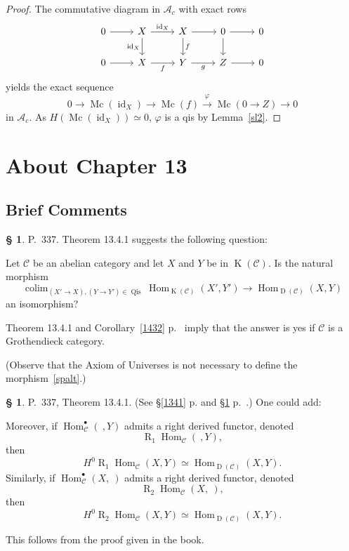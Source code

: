 \documentclass[12pt]{article}
\theoremstyle{remark}
\theoremstyle{definition}
\newtheorem{s}[thm]{\S}
\newcommand{\bu}{\bullet}
\newcommand{\oo}{\operatorname}
\newcommand{\A}{\mathcal A}
\newcommand{\C}{\mathcal C}
\newcommand{\pp}{\varphi}
\newcommand{\xr}{\xrightarrow}
\DeclareMathOperator*{\colim}{colim}
\DeclareMathOperator{\id}{id}
\DeclareMathOperator{\Hom}{Hom}
\DeclareMathOperator{\Mc}{Mc}
\begin{document}
\begin{proof}
The commutative diagram in $\A_c$ with exact rows 
$$
\begin{tikzcd}
0\ar{r}&X\ar{d}[swap]{\id_X}\ar{r}{\id_X}&X\ar{d}{f}\ar{r}&0\ar{d}\ar{r}&0\\ 
0\ar{r}&X\ar{r}[swap]{f}&Y\ar{r}[swap]{g}&Z\ar{r}&0
\end{tikzcd}
$$ 
yields the exact sequence 
$$
0\to\Mc(\id_X)\to\Mc(f)\xr\pp\Mc(0\to Z)\to0
$$
in $\A_c$. As $H(\Mc(\id_X))\simeq0$, $\pp$ is a qis by Lemma~\ref{sl2}.
\end{proof}


\section{About Chapter 13}

\subsection{Brief Comments}

\begin{s}\label{q337}
P.~337. Theorem 13.4.1 suggests the following question: 

Let $\C$ be an abelian category and let $X$ and $Y$ be in $\oo K(\C)$. Is the natural morphism 
%
\begin{equation}\label{spalt}
\colim_{(X'\to X),(Y\to Y')\in\oo{Qis}}\Hom_{\oo K(\C)}(X',Y')\to\Hom_{\oo D(\C)}(X,Y)
\end{equation}
%
an isomorphism?

Theorem 13.4.1 and Corollary~\ref{1432} p.~\pageref{1432} imply that the answer is yes if $\C$ is a Grothendieck category. 

(Observe that the Axiom of Universes is not necessary to define the morphism~\eqref{spalt}.)
\end{s}

%

\begin{s}
P.~337, Theorem 13.4.1. (See \S\ref{1341} p. \pageref{1341} and \S\ref{q337} p.~\pageref{q337}.) One could add:

Moreover, if $\Hom_\C^\bu(\ ,Y)$ admits a right derived functor, denoted 
$$
\oo R_1\!\Hom_\C(\ ,Y),
$$ 
then 
$$
H^0\oo R_1\!\Hom_\C(X,Y)\simeq\Hom_{\oo D(\C)}(X,Y).
$$ 
Similarly, if $\Hom_\C^\bu(X,\ )$ admits a right derived functor, denoted 
$$
\oo R_2\!\Hom_\C(X,\ ),
$$ 
then 
$$
H^0\oo R_2\!\Hom_\C(X,Y)\simeq\Hom_{\oo D(\C)}(X,Y).
$$

This follows from the proof given in the book. 
\end{s}
\end{document}
